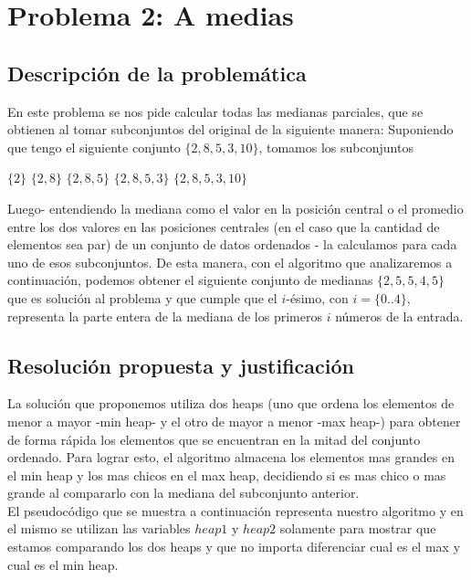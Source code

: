 \section{Problema 2: A medias}

\subsection{Descripción de la problemática}
En este problema se nos pide calcular todas las medianas parciales, que se obtienen al tomar subconjuntos del original de la siguiente manera:
Suponiendo que tengo el siguiente conjunto $\{2,8,5,3,10\}$, tomamos los subconjuntos
\begin{center}
	$\{2\}$ $\{2,8\}$ $\{2,8,5\}$ $\{2,8,5,3\}$ $\{2,8,5,3,10\}$
\end{center}
Luego- entendiendo la mediana como el valor en la posición central o el promedio entre los dos valores en las posiciones centrales (en el caso que la cantidad de elementos sea par) de un conjunto de datos ordenados - la calculamos para cada uno de esos subconjuntos. De esta manera, con el algoritmo que analizaremos a continuación, podemos obtener el siguiente conjunto de medianas $\{2,5,5,4,5\}$ que es solución al problema y que cumple que el $i$-ésimo, con $i = \{0 $..$ 4\}$, representa la parte entera de la mediana de los primeros $i$ números de la entrada.

\subsection{Resolución propuesta y justificación}

La solución que proponemos utiliza dos heaps (uno que ordena los elementos de menor a mayor -min heap- y el otro de mayor a menor -max heap-) para obtener de forma rápida los elementos que se encuentran en la mitad del conjunto ordenado. Para lograr esto, el algoritmo almacena los elementos mas grandes en el min heap y los mas chicos en el max heap, decidiendo si es mas chico o mas grande al compararlo con la mediana del subconjunto anterior.\\

El pseudocódigo que se muestra a continuación representa nuestro algoritmo y en el mismo se utilizan las variables $heap1$ y $heap2$ solamente para mostrar que estamos comparando los dos heaps y que no importa diferenciar cual es el max y cual es el min heap.\\

